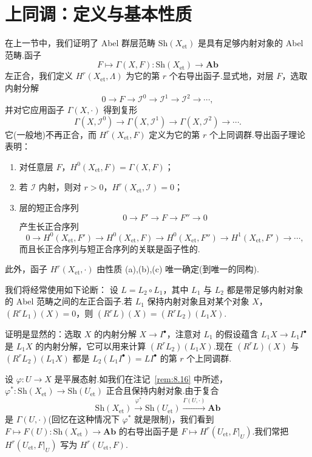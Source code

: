 ﻿%
\chapter{上同调：定义与基本性质}\label{sec:9}

在上一节中，我们证明了 Abel 群层范畴 $\mathrm{Sh}(X_{\mathrm{et}})$ 是具有足够内射对象的 Abel 范畴.函子
\[
F \mapsto \Gamma(X, F) \colon \mathrm{Sh}(X_{\mathrm{et}}) \to \mathbf{Ab}
\]
左正合，我们定义 $H^{r}(X_{\mathrm{et}}, \Lambda)$ 为它的第 $r$ 个右导出函子.显式地，对层 $F$，选取内射分解
\[
0 \to F \to \mathcal{I}^{0} \to \mathcal{I}^{1} \to \mathcal{I}^{2} \to \cdots,
\]
并对它应用函子 $\Gamma(X, \cdot)$ 得到复形
\[
\Gamma(X, \mathcal{I}^{0}) \to \Gamma(X, \mathcal{I}^{1}) \to \Gamma(X, \mathcal{I}^{2}) \to \cdots.
\]
它(一般地)不再正合，而 $H^{r}(X_{\mathrm{et}}, F)$ 定义为它的第 $r$ 个上同调群.导出函子理论表明：
\begin{enumerate}
  \item 对任意层 $F$，$H^{0}(X_{\mathrm{et}}, F) = \Gamma(X, F)$；
  \item 若 $\mathcal{I}$ 内射，则对 $r > 0$，$H^{r}(X_{\mathrm{et}}, \mathcal{I}) = 0$；
  \item 层的短正合序列
  \[
  0 \to F' \to F \to F'' \to 0
  \]
  产生长正合序列
  \[
  0 \to H^{0}(X_{\mathrm{et}}, F') \to H^{0}(X_{\mathrm{et}}, F) \to H^{0}(X_{\mathrm{et}}, F'') \to H^{1}(X_{\mathrm{et}}, F') \to \cdots,
  \]
  而且长正合序列与短正合序列的关联是函子性的.
\end{enumerate}
此外，函子 $H^{r}(X_{\mathrm{et}}, \cdot)$ 由性质 (a),(b),(c) 唯一确定(到唯一的同构).

\begin{remark}\label{rem:9.1}
我们将经常使用如下论断：
设 $L = L_2 \circ L_1$，其中 $L_1$ 与 $L_2$ 都是带足够内射对象的 Abel 范畴之间的左正合函子.若 $L_1$ 保持内射对象且对某个对象 $X$，$(R^{r}L_1)(X) = 0$，则 $(R^{r}L)(X) = (R^{r}L_2)(L_1X)$.

证明是显然的：选取 $X$ 的内射分解 $X \to I^{\bullet}$，注意对 $L_1$ 的假设蕴含 $L_1X \to L_1I^{\bullet}$ 是 $L_1X$ 的内射分解，它可以用来计算 $(R^{r}L_2)(L_1X)$.现在 $(R^{r}L)(X)$ 与 $(R^{r}L_2)(L_1X)$ 都是 $L_2(L_1I^{\bullet}) = LI^{\bullet}$ 的第 $r$ 个上同调群.
\end{remark}

\begin{remark}\label{rem:9.2}
设 $\varphi \colon U \to X$ 是平展态射.如我们在注记~\ref{rem:8.16} 中所述，$\varphi^{*} \colon \mathrm{Sh}(X_{\mathrm{et}}) \to \mathrm{Sh}(U_{\mathrm{et}})$ 正合且保持内射对象.由于复合
\[
\mathrm{Sh}(X_{\mathrm{et}}) \xrightarrow{\varphi^{*}} \mathrm{Sh}(U_{\mathrm{et}}) \xrightarrow{\Gamma(U, \cdot)} \mathbf{Ab}
\]
是 $\Gamma(U, \cdot)$(回忆在这种情况下 $\varphi^{*}$ 就是限制)，我们看到 $F \mapsto F(U) \colon \mathrm{Sh}(X_{\mathrm{et}}) \to \mathbf{Ab}$ 的右导出函子是 $F \mapsto H^{r}(U_{\mathrm{et}}, F|_{U})$.我们常把 $H^{r}(U_{\mathrm{et}}, F|_{U})$ 写为 $H^{r}(U_{\mathrm{et}}, F)$.
\end{remark}

